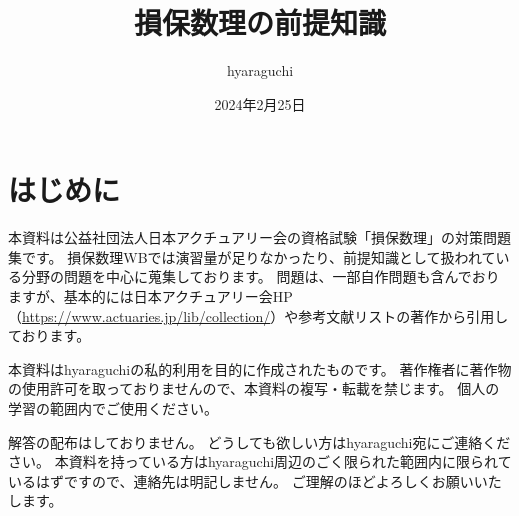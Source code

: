 \documentclass[10pt]{jsarticle}%
\begin{document}
\title{損保数理の前提知識}
\author{hyaraguchi}
\date{2024年2月25日}
\maketitle




\tableofcontents%

\newpage

\section{はじめに}


本資料は公益社団法人日本アクチュアリー会の資格試験「損保数理」の対策問題集です。
損保数理WBでは演習量が足りなかったり、前提知識として扱われている分野の問題を中心に蒐集しております。
問題は、一部自作問題も含んでおりますが、基本的には日本アクチュアリー会HP（\url{https://www.actuaries.jp/lib/collection/}）や参考文献リストの著作から引用しております。

本資料はhyaraguchiの私的利用を目的に作成されたものです。
著作権者に著作物の使用許可を取っておりませんので、本資料の複写・転載を禁じます。
個人の学習の範囲内でご使用ください。

解答の配布はしておりません。
どうしても欲しい方はhyaraguchi宛にご連絡ください。
本資料を持っている方はhyaraguchi周辺のごく限られた範囲内に限られているはずですので、連絡先は明記しません。
ご理解のほどよろしくお願いいたします。


\newpage



\newpage





\newpage




\newpage



\newpage






\newpage
\end{document}
